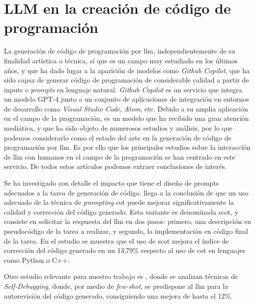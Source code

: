 \section{LLM en la creación de código de programación}
\label{sec:llm_creacion_codigo_programacion_estado_cuestion}

La generación de código de programación por \gls{llm}, independientemente de su finalidad artística o técnica, sí que es un campo muy estudiado en los últimos años, y que ha dado lugar a la aparición de modelos como \textit{Github Copilot}, que ha sido capaz de generar código de programación de considerable calidad a partir de inputs o \textit{prompts} en lenguaje natural. \textit{Github Copilot} es un servicio que integra un modelo GPT-4 junto a un conjunto de aplicaciones de integración en entornos de desarrollo como \textit{Visual Studio Code}, \textit{Atom}, etc. Debido a su amplia aplicación en el campo de la programación, es un modelo que ha recibido una gran atención mediática, y que ha sido objeto de numerosos estudios y análisis, por lo que podemos considerarlo como el estado del arte en la generación de código de programación por \gls{llm}. Es por ello que los principales estudios sobre la interacción de \gls{llm} con humanos en el campo de la programación se han centrado en este servicio. De todos estos artículos podemos extraer conclusiones de interés.

Se ha investigado con detalle el impacto que tiene el diseño de prompts adecuados a la tarea de generación de código. \cite{liStructuredChainofThoughtPrompting2023} llega a la conclusión de que un uso adecuado de la técnica de \textit{prompting} \gls{cot} puede mejorar significativamente la calidad y corrección del código generado. Esta variante es denominada \gls{scot}, y consiste en solicitar la respuesta del \gls{llm} en dos pasos: primero, una descripción en pseudocódigo de la tarea a realizar, y segundo, la implementación en código final de la tarea. En el estudio se muestra que el uso de \gls{scot} mejora el índice de corrección del código generado en un 13,79\% respecto al uso de \gls{cot} en lenguajes como Python o C++.

Otro estudio relevante para nuestro trabajo es \cite{chenTeachingLargeLanguage2023}, donde se analizan técnicas de \textit{Self-Debugging}, donde, por medio de \textit{few-shot}, se predispone al \gls{llm} para la autorevisión del código generado, consiguiendo una mejora de hasta el 12\%.

